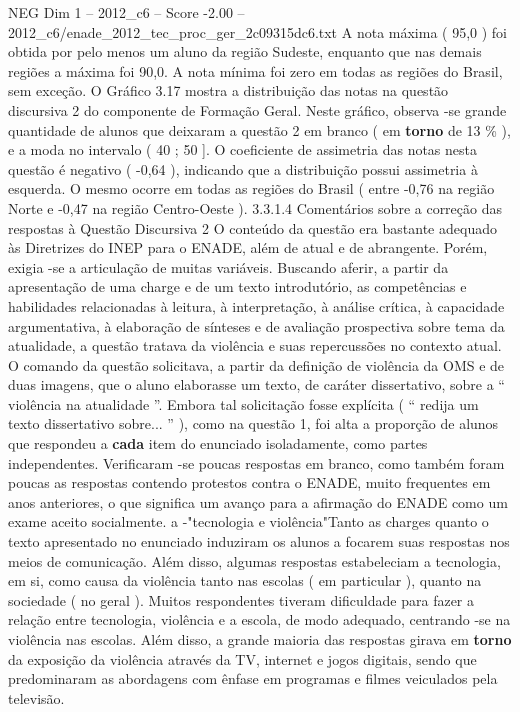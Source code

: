 \begin{textsample}{NEG Dim 1 – 2012\_c6 – Score -2.00 – 2012\_c6/enade\_2012\_tec\_proc\_ger\_2c09315dc6.txt}
A nota máxima ( 95,0 ) foi obtida por pelo menos um aluno da região Sudeste, enquanto que nas demais regiões a máxima foi 90,0.
A nota mínima foi zero em todas as regiões do Brasil, sem exceção.
O Gráfico 3.17 mostra a distribuição das notas na questão discursiva 2 do componente de Formação Geral.
Neste gráfico, observa -se grande quantidade de alunos que deixaram a questão 2 em branco ( em \textbf{torno} de 13 \% ), e a moda no intervalo ( 40 ; 50 ].
O coeficiente de assimetria das notas nesta questão é negativo ( -0,64 ), indicando que a distribuição possui assimetria à esquerda.
O mesmo ocorre em todas as regiões do Brasil ( entre -0,76 na região Norte e -0,47 na região Centro-Oeste ). 3.3.1.4 Comentários sobre a correção das respostas à Questão Discursiva 2 O conteúdo da questão era bastante adequado às Diretrizes do INEP para o ENADE, além de atual e de abrangente.
Porém, exigia -se a articulação de muitas variáveis.
Buscando aferir, a partir da apresentação de uma charge e de um texto introdutório, as competências e habilidades relacionadas à leitura, à interpretação, à análise crítica, à capacidade argumentativa, à elaboração de sínteses e de avaliação prospectiva sobre tema da atualidade, a questão tratava da violência e suas repercussões no contexto atual.
O comando da questão solicitava, a partir da definição de violência da OMS e de duas imagens, que o aluno elaborasse um texto, de caráter dissertativo, sobre a “ violência na atualidade ”.
Embora tal solicitação fosse explícita ( “ redija um texto dissertativo sobre... ” ), como na questão 1, foi alta a proporção de alunos que respondeu a \textbf{cada} item do enunciado isoladamente, como partes independentes.
Verificaram -se poucas respostas em branco, como também foram poucas as respostas contendo protestos contra o ENADE, muito frequentes em anos anteriores, o que significa um avanço para a afirmação do ENADE como um exame aceito socialmente. a -"tecnologia e violência"Tanto as charges quanto o texto apresentado no enunciado induziram os alunos a focarem suas respostas nos meios de comunicação.
Além disso, algumas respostas estabeleciam a tecnologia, em si, como causa da violência tanto nas escolas ( em particular ), quanto na sociedade ( no geral ).
Muitos respondentes tiveram dificuldade para fazer a relação entre tecnologia, violência e a escola, de modo adequado, centrando -se na violência nas escolas.
Além disso, a grande maioria das respostas girava em \textbf{torno} da exposição da violência através da TV, internet e jogos digitais, sendo que predominaram as abordagens com ênfase em programas e filmes veiculados pela televisão.

\end{textsample}
